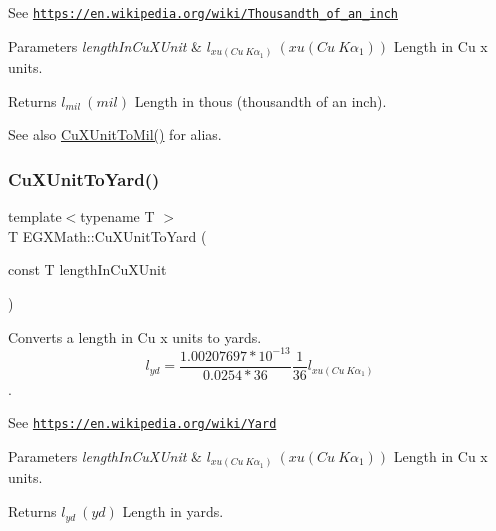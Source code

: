 See \href{https://en.wikipedia.org/wiki/Thousandth_of_an_inch}{\tt https\+://en.\+wikipedia.\+org/wiki/\+Thousandth\+\_\+of\+\_\+an\+\_\+inch} 
\begin{DoxyParams}{Parameters}
{\em length\+In\+Cu\+X\+Unit} & $ l_{xu(Cu\ K\alpha_1)}\ (xu(Cu\ K\alpha_1))$ Length in Cu x units. \\
\hline
\end{DoxyParams}
\begin{DoxyReturn}{Returns}
$ l_{mil}\ (mil)$ Length in thous (thousandth of an inch). 
\end{DoxyReturn}
\begin{DoxySeeAlso}{See also}
\mbox{\hyperlink{group___e_g_x_math-_conversions-_length_conversions-_non-_s_i-_cu_x_unit-_imperial_ga060d8ffc384bcba07e0fde612e1a2156}{Cu\+X\+Unit\+To\+Mil()}} for alias. 
\end{DoxySeeAlso}
\mbox{\label{group___e_g_x_math-_conversions-_length_conversions-_non-_s_i-_cu_x_unit-_imperial_ga9f1d992d0b4ec16bf1d10bd0b0d96f96}} 
\subsubsection{\texorpdfstring{Cu\+X\+Unit\+To\+Yard()}{CuXUnitToYard()}}
{\footnotesize\ttfamily template$<$typename T $>$ \\
T E\+G\+X\+Math\+::\+Cu\+X\+Unit\+To\+Yard (\begin{DoxyParamCaption}\item[{const T}]{length\+In\+Cu\+X\+Unit }\end{DoxyParamCaption})}



Converts a length in Cu x units to yards. \[ l_{yd}= \frac{1.00207697*10^{-13}}{0.0254 * 36} \frac{1}{36} l_{xu(Cu\ K\alpha_1)} \]. 

See \href{https://en.wikipedia.org/wiki/Yard}{\tt https\+://en.\+wikipedia.\+org/wiki/\+Yard} 
\begin{DoxyParams}{Parameters}
{\em length\+In\+Cu\+X\+Unit} & $ l_{xu(Cu\ K\alpha_1)}\ (xu(Cu\ K\alpha_1))$ Length in Cu x units. \\
\hline
\end{DoxyParams}
\begin{DoxyReturn}{Returns}
$ l_{yd}\ (yd)$ Length in yards. 
\end{DoxyReturn}
